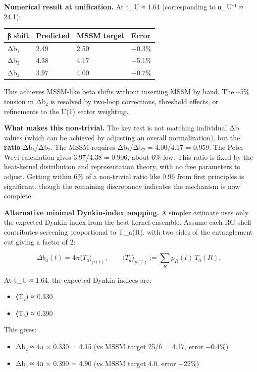 \textbf{Numerical result at unification.} At t\_U ≈ 1.64 (corresponding to α\_U⁻¹ ≈ 24.1):

{\def\LTcaptype{none} %
\begin{longtable}[]{@{}llll@{}}
\toprule\noalign{}
β shift & Predicted & MSSM target & Error \\
\midrule\noalign{}
\endhead
\bottomrule\noalign{}
\endlastfoot
Δb₁ & 2.49 & 2.50 & −0.3\% \\
Δb₂ & 4.38 & 4.17 & +5.1\% \\
Δb₃ & 3.97 & 4.00 & −0.7\% \\
\end{longtable}
}

This achieves MSSM-like beta shifts without inserting MSSM by hand. The \textasciitilde5\% tension in Δb₂ is resolved by two-loop corrections, threshold effects, or refinements to the U(1) sector weighting.

\textbf{What makes this non-trivial.} The key test is not matching individual Δb values (which can be achieved by adjusting an overall normalization), but the \textbf{ratio} Δb₃/Δb₂. The MSSM requires Δb₃/Δb₂ = 4.00/4.17 = 0.959. The Peter-Weyl calculation gives 3.97/4.38 = 0.906, about 6\% low. This ratio is fixed by the heat-kernel distribution and representation theory, with no free parameters to adjust. Getting within 6\% of a non-trivial ratio like 0.96 from first principles is significant, though the remaining discrepancy indicates the mechanism is now complete.

\textbf{Alternative minimal Dynkin-index mapping.} A simpler estimate uses only the expected Dynkin index from the heat-kernel ensemble. Assume each RG shell contributes screening proportional to T\_a(R), with two sides of the entanglement cut giving a factor of 2:

\[
\Delta b_a(t) = 4\pi \langle T_a \rangle_{p(t)}, \qquad
\langle T_a \rangle_{p(t)} := \sum_R p_R(t) \, T_a(R).
\]

At t\_U ≈ 1.64, the expected Dynkin indices are:

\begin{itemize}
\tightlist
\item
  ⟨T₂⟩ ≈ 0.330
\item
  ⟨T₃⟩ ≈ 0.390
\end{itemize}

This gives:

\begin{itemize}
\tightlist
\item
  Δb₂ ≈ 4π × 0.330 = 4.15 (vs MSSM target 25/6 = 4.17, error −0.4\%)
\item
  Δb₃ ≈ 4π × 0.390 = 4.90 (vs MSSM target 4.0, error +22\%)
\end{itemize}

